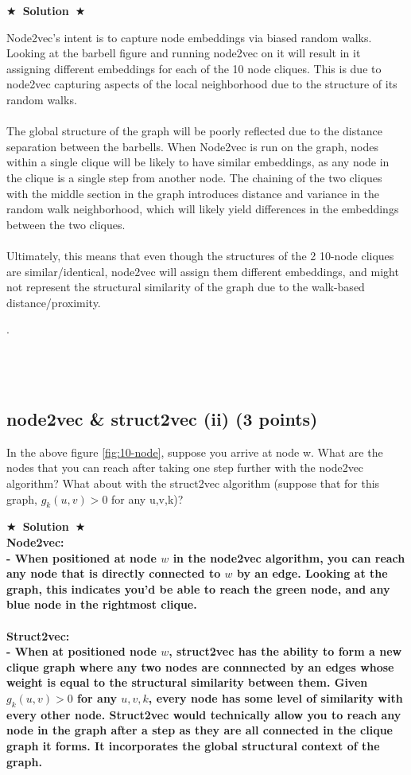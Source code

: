 \documentclass{article}
\numberwithin{figure}{section}
\newcommand{\Solution}[1]{{\medskip \color{red} \bf $\bigstar$~\sf \textbf{Solution}~$\bigstar$ \sf #1 } \bigskip}
\begin{document}
\Solution{

Node2vec's intent is to capture node embeddings via biased random walks. Looking at the barbell figure and running node2vec on it will result in it assigning different embeddings for each of the 10 node cliques. This is due to node2vec capturing aspects of the local neighborhood due to the structure of its random walks.\\\\ The global structure of the graph will be poorly reflected due to the distance separation between the barbells. When Node2vec is run on the graph, nodes within a single clique will be likely to have similar embeddings, as any node in the clique is a single step from another node. The chaining of the two cliques with the middle section in the graph introduces distance and variance in the random walk neighborhood, which will likely yield differences in the embeddings between the two cliques. \\\\Ultimately, this means that even though the structures of the 2 10-node cliques are similar/identical, node2vec will assign them different embeddings, and might not represent the structural similarity of the graph due to the walk-based distance/proximity.

}

.\\\\\\\\
\subsection{ node2vec \& struct2vec (ii) (3 points)}
In the above figure \ref{fig:10-node}, suppose you arrive at node w. What are the nodes that you can reach after taking one step further with the node2vec algorithm? What about with the struct2vec algorithm (suppose that for this graph, $g_k(u, v) > 0$ for any u,v,k)?

\Solution{
\\
\textbf{Node2vec}:\\
- When positioned at node $w$ in the node2vec algorithm, you can reach any node that is directly connected to $w$ by an edge. Looking at the graph, this indicates you'd be able to reach the green node, and any blue node in the rightmost clique.\\\\
\textbf{Struct2vec}:\\
- When at positioned node $w$, struct2vec has the ability to form a new clique graph where any two nodes are connnected by an edges whose weight is equal to the structural similarity between them. Given $g_k(u,v) > 0$ for any $u,v,k$, every node has some level of similarity with every other node. Struct2vec would technically allow you to reach any node in the graph after a step as they are all connected in the clique graph it forms. It incorporates the global structural context of the graph.

}
\end{document}
